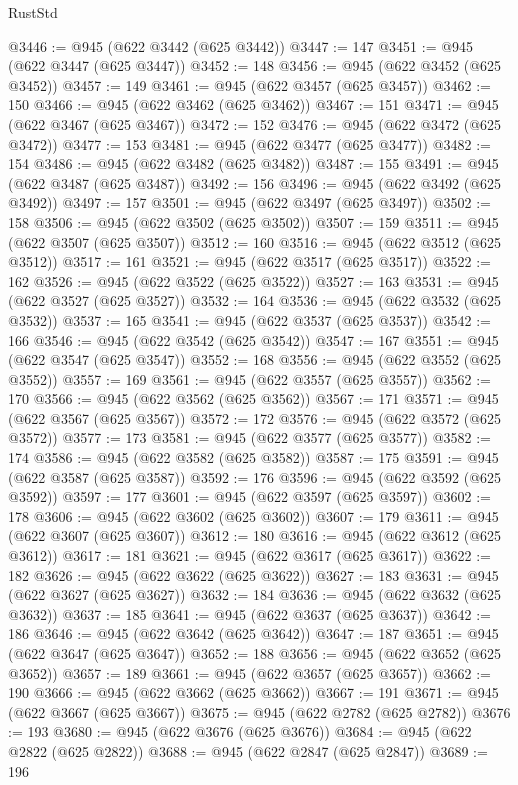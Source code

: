 \begin{lexlean}{RustStd}
\begin{coremodule}
@3446 := @945 (@622 @3442 (@625 @3442))
@3447 := 147
@3451 := @945 (@622 @3447 (@625 @3447))
@3452 := 148
@3456 := @945 (@622 @3452 (@625 @3452))
@3457 := 149
@3461 := @945 (@622 @3457 (@625 @3457))
@3462 := 150
@3466 := @945 (@622 @3462 (@625 @3462))
@3467 := 151
@3471 := @945 (@622 @3467 (@625 @3467))
@3472 := 152
@3476 := @945 (@622 @3472 (@625 @3472))
@3477 := 153
@3481 := @945 (@622 @3477 (@625 @3477))
@3482 := 154
@3486 := @945 (@622 @3482 (@625 @3482))
@3487 := 155
@3491 := @945 (@622 @3487 (@625 @3487))
@3492 := 156
@3496 := @945 (@622 @3492 (@625 @3492))
@3497 := 157
@3501 := @945 (@622 @3497 (@625 @3497))
@3502 := 158
@3506 := @945 (@622 @3502 (@625 @3502))
@3507 := 159
@3511 := @945 (@622 @3507 (@625 @3507))
@3512 := 160
@3516 := @945 (@622 @3512 (@625 @3512))
@3517 := 161
@3521 := @945 (@622 @3517 (@625 @3517))
@3522 := 162
@3526 := @945 (@622 @3522 (@625 @3522))
@3527 := 163
@3531 := @945 (@622 @3527 (@625 @3527))
@3532 := 164
@3536 := @945 (@622 @3532 (@625 @3532))
@3537 := 165
@3541 := @945 (@622 @3537 (@625 @3537))
@3542 := 166
@3546 := @945 (@622 @3542 (@625 @3542))
@3547 := 167
@3551 := @945 (@622 @3547 (@625 @3547))
@3552 := 168
@3556 := @945 (@622 @3552 (@625 @3552))
@3557 := 169
@3561 := @945 (@622 @3557 (@625 @3557))
@3562 := 170
@3566 := @945 (@622 @3562 (@625 @3562))
@3567 := 171
@3571 := @945 (@622 @3567 (@625 @3567))
@3572 := 172
@3576 := @945 (@622 @3572 (@625 @3572))
@3577 := 173
@3581 := @945 (@622 @3577 (@625 @3577))
@3582 := 174
@3586 := @945 (@622 @3582 (@625 @3582))
@3587 := 175
@3591 := @945 (@622 @3587 (@625 @3587))
@3592 := 176
@3596 := @945 (@622 @3592 (@625 @3592))
@3597 := 177
@3601 := @945 (@622 @3597 (@625 @3597))
@3602 := 178
@3606 := @945 (@622 @3602 (@625 @3602))
@3607 := 179
@3611 := @945 (@622 @3607 (@625 @3607))
@3612 := 180
@3616 := @945 (@622 @3612 (@625 @3612))
@3617 := 181
@3621 := @945 (@622 @3617 (@625 @3617))
@3622 := 182
@3626 := @945 (@622 @3622 (@625 @3622))
@3627 := 183
@3631 := @945 (@622 @3627 (@625 @3627))
@3632 := 184
@3636 := @945 (@622 @3632 (@625 @3632))
@3637 := 185
@3641 := @945 (@622 @3637 (@625 @3637))
@3642 := 186
@3646 := @945 (@622 @3642 (@625 @3642))
@3647 := 187
@3651 := @945 (@622 @3647 (@625 @3647))
@3652 := 188
@3656 := @945 (@622 @3652 (@625 @3652))
@3657 := 189
@3661 := @945 (@622 @3657 (@625 @3657))
@3662 := 190
@3666 := @945 (@622 @3662 (@625 @3662))
@3667 := 191
@3671 := @945 (@622 @3667 (@625 @3667))
@3675 := @945 (@622 @2782 (@625 @2782))
@3676 := 193
@3680 := @945 (@622 @3676 (@625 @3676))
@3684 := @945 (@622 @2822 (@625 @2822))
@3688 := @945 (@622 @2847 (@625 @2847))
@3689 := 196

\end{coremodule}
\end{lexlean}
